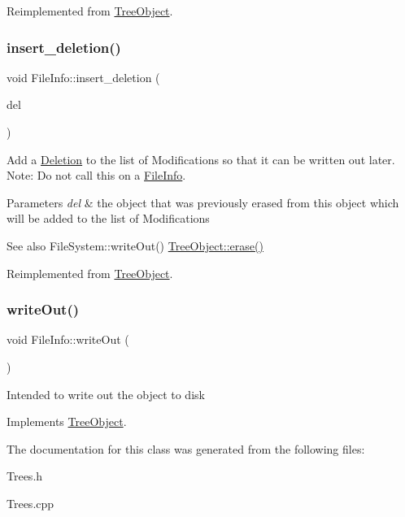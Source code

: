 Reimplemented from \mbox{\hyperlink{classTreeObject_a41ce6080e0df5adcea4b0a76d35af885}{Tree\+Object}}.

\mbox{\label{classFileInfo_a278136b1d68f55dc56a4be807076fc0d}} 
\subsubsection{\texorpdfstring{insert\+\_\+deletion()}{insert\_deletion()}}
{\footnotesize\ttfamily void File\+Info\+::insert\+\_\+deletion (\begin{DoxyParamCaption}\item[{\mbox{\hyperlink{classTreeObject}{Tree\+Object}} $\ast$}]{del }\end{DoxyParamCaption})\hspace{0.3cm}{\ttfamily [virtual]}}

Add a \mbox{\hyperlink{classDeletion}{Deletion}} to the list of Modifications so that it can be written out later. Note\+: Do not call this on a \mbox{\hyperlink{classFileInfo}{File\+Info}}. 
\begin{DoxyParams}{Parameters}
{\em del} & the object that was previously erased from this object which will be added to the list of Modifications \\
\hline
\end{DoxyParams}
\begin{DoxySeeAlso}{See also}
File\+System\+::write\+Out() \mbox{\hyperlink{classTreeObject_a453b5df2a9ef7c6faad259900d574ee2}{Tree\+Object\+::erase()}} 
\end{DoxySeeAlso}


Reimplemented from \mbox{\hyperlink{classTreeObject_afcc4b3928d2b77ff080aa229a9706215}{Tree\+Object}}.

\mbox{\label{classFileInfo_a15d8f9279f1d60e4db4618cb81e68414}} 
\subsubsection{\texorpdfstring{write\+Out()}{writeOut()}}
{\footnotesize\ttfamily void File\+Info\+::write\+Out (\begin{DoxyParamCaption}{ }\end{DoxyParamCaption})\hspace{0.3cm}{\ttfamily [virtual]}}

Intended to write out the object to disk 

Implements \mbox{\hyperlink{classTreeObject_abf2bf88337bec961784b5dfeb9b795ed}{Tree\+Object}}.



The documentation for this class was generated from the following files\+:\begin{DoxyCompactItemize}
\item 
Trees.\+h\item 
Trees.\+cpp\end{DoxyCompactItemize}
